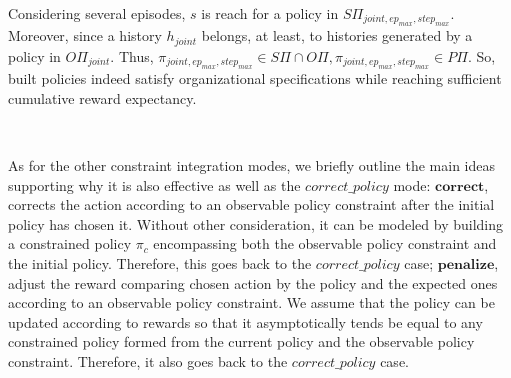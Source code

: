 \begin{proofoutline}
    Considering several episodes, $s$ is reach for a policy in $\allowbreak S\Pi_{joint,ep_{max},step_{max}}$. Moreover, since a history $h_{joint}$ belongs, at least, to histories generated by a policy in $O\Pi_{joint}$. Thus, $\pi_{joint,ep_{max},step_{max}} \in S\Pi \cap O\Pi, \pi_{joint,ep_{max},step_{max}} \in P\Pi$. So, built policies indeed satisfy organizational specifications while reaching sufficient cumulative reward expectancy.

    \

    As for the other constraint integration modes, we briefly outline the main ideas supporting why it is also effective as well as the $correct\_policy$ mode:
    $\mathbf{correct}$, corrects the action according to an observable policy constraint after the initial policy has chosen it. Without other consideration, it can be modeled by building a constrained policy $\pi_c$ encompassing both the observable policy constraint and the initial policy. Therefore, this goes back to the $correct\_policy$ case;
    $\mathbf{penalize}$, adjust the reward comparing chosen action by the policy and the expected ones according to an observable policy constraint. We assume that the policy can be updated according to rewards so that it asymptotically tends be equal to any constrained policy formed from the current policy and the observable policy constraint. Therefore, it also goes back to the $correct\_policy$ case.

\end{proofoutline}